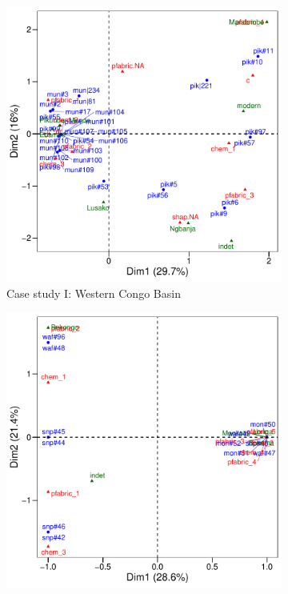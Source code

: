 \documentclass[a4paper]{article}
\begin{document}
\begin{figure}[H]
	\centering
	\begin{subfigure}[t]{.66\textwidth}
		\includegraphics[width=\textwidth]{Fig_Synthesis_wCB.pdf}
		\caption{Case study I: Western Congo Basin\vspace{2em}}
		\label{fig:synthesis.wCB}
	\end{subfigure}
	\linebreak
	\begin{subfigure}[t]{.66\textwidth}
		\includegraphics[width=\textwidth]{Fig_Synthesis_luilaka.pdf}

\end{subfigure}
\end{figure}
\end{document}

